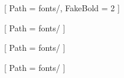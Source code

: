 
\pagestyle{empty}
\setlength{\parindent}{0pt}



\newcommand{\FDIComicFolder}{comic_files}
\newcommand{\FDIBlankoFile}{\FDIComicFolder/BLANKO_1-12_v1.0.0.pdf}


[
  Path = fonts/,
  FakeBold = 2
]

[
  Path = fonts/
]

[
  Path = fonts/
]

[
  Path = fonts/
]



\providecommand{\KarolingischeMinuskel}{}
\providecommand{\FDIOverlayFont}{}
\providecommand{\ArialBOLDFont}{}
\providecommand{\ArialFont}{}

%

